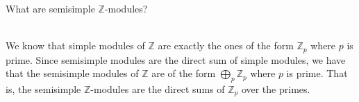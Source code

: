 What are semisimple $\mathbb{Z}$-modules?\\

\begin{solution}\renewcommand{\qedsymbol}{}\ \\
    We know that simple modules of $\mathbb{Z}$ are exactly the ones of the form $\mathbb{Z}_p$ where
    $p$ is prime. Since semisimple modules are the direct sum of simple modules, we have that the
    semisimple modules of $\mathbb{Z}$ are of the form $\bigoplus_p\mathbb{Z}_p$ where $p$ is prime.
    That is, the semisimple $\mathbb{Z}$-modules are the direct sums of $\mathbb{Z}_p$ over the primes.

\end{solution}
